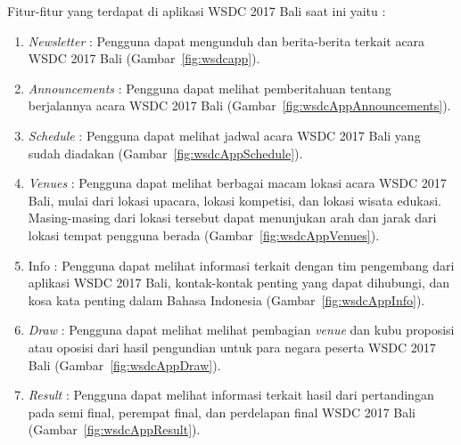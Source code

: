 Fitur-fitur yang terdapat di aplikasi WSDC 2017 Bali saat ini yaitu :

\begin{enumerate}
	\item {\it Newsletter} : Pengguna dapat mengunduh dan berita-berita terkait acara WSDC 2017 Bali (Gambar~\ref{fig:wsdcapp}).

	\item {\it Announcements} : Pengguna dapat melihat pemberitahuan tentang berjalannya acara WSDC 2017 Bali (Gambar~\ref{fig:wsdcAppAnnouncements}).

	\item {\it Schedule} : Pengguna dapat melihat jadwal acara WSDC 2017 Bali yang sudah diadakan (Gambar~\ref{fig:wsdcAppSchedule}).

	\item {\it Venues} : Pengguna dapat melihat berbagai macam lokasi acara WSDC 2017 Bali, mulai dari lokasi upacara, lokasi kompetisi, dan lokasi wisata edukasi. Masing-masing dari lokasi tersebut dapat menunjukan arah dan jarak dari lokasi tempat pengguna berada (Gambar~\ref{fig:wsdcAppVenues}).

	\item Info : Pengguna dapat melihat informasi terkait dengan tim pengembang dari aplikasi WSDC 2017 Bali, kontak-kontak penting yang dapat dihubungi, dan kosa kata penting dalam Bahasa Indonesia (Gambar~\ref{fig:wsdcAppInfo}).

	\item {\it Draw} : Pengguna dapat melihat melihat pembagian {\it venue} dan kubu proposisi atau oposisi dari hasil pengundian untuk para negara peserta WSDC 2017 Bali (Gambar~\ref{fig:wsdcAppDraw}).

	\item {\it Result} : Pengguna dapat melihat informasi terkait hasil dari pertandingan pada semi final, perempat final, dan perdelapan final WSDC 2017 Bali (Gambar~\ref{fig:wsdcAppResult}).
\end{enumerate}

